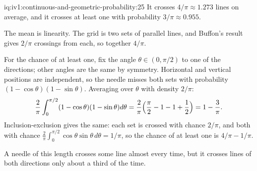 \begin{solution}{iq:iv1:continuous-and-geometric-probability:25}
It crosses $4/\pi \approx 1.273$ lines on average, and it crosses at least one with probability $3/\pi \approx 0.955$.

The mean is linearity. The grid is two sets of parallel lines, and Buffon's result gives $2/\pi$ crossings from each, so together $4/\pi$.

For the chance of at least one, fix the angle $\theta \in (0, \pi/2)$ to one of the directions; other angles are the same by symmetry. Horizontal and vertical positions are independent, so the needle misses both sets with probability $(1 - \cos\theta)(1 - \sin\theta)$. Averaging over $\theta$ with density $2/\pi$:
\[
\frac{2}{\pi} \int_0^{\pi/2} (1 - \cos\theta)(1 - \sin\theta) d\theta = \frac{2}{\pi}\Bigl(\frac{\pi}{2} - 1 - 1 + \frac12\Bigr) = 1 - \frac{3}{\pi}.
\]
Inclusion-exclusion gives the same: each set is crossed with chance $2/\pi$, and both with chance $\frac{2}{\pi}\int_0^{\pi/2}\cos\theta\sin\theta\, d\theta = 1/\pi$, so the chance of at least one is $4/\pi - 1/\pi$.

A needle of this length crosses some line almost every time, but it crosses lines of both directions only about a third of the time.

\end{solution}
